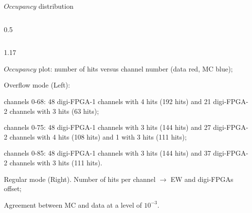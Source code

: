 \documentclass{beamer}
\begin{document}
\begin{frame}{$Occupancy$ distribution}
\begin{columns}
\begin{column}{0.5 \framewidth}
\begin{figure}[H]
\end{figure} 
    \end{column}
\end{columns}      
 \begin{columns}
    \begin{column}{1.17\framewidth}
        \setlength{\leftmargini}{1.2em}
     \begin{itemize}
     {\footnotesize
      \item $Occupancy$ plot: number of hits versus channel number (data red, MC blue);
    \item Overflow mode (Left):   }
    \begin{itemize}
    {\footnotesize
        \item channels 0-68: 48 digi-FPGA-1 channels with 4 hits (192 hits) and 21 digi-FPGA-2 channels with 3 hits (63 hits);
        \item channels 0-75: 48 digi-FPGA-1 channels with 3 hits (144 hits) and 27 digi-FPGA-2 channels with 4 hits (108 hits) and 1 with 3 hits (111 hits);
        \item channels 0-85: 48 digi-FPGA-1 channels with 3 hits (144 hits) and 37 digi-FPGA-2 channels with 3 hits (111 hits).}
    \end{itemize}
    {\footnotesize \item  Regular mode (Right). Number of hits per channel $\rightarrow$ EW and digi-FPGAs offset;
        \vspace{-0.5mm}
    \item Agreement between MC and data at a level of $10^{-3}$.
    }
   
        \end{itemize}
             \end{column}
\end{columns}     
\end{frame}
\end{document}
